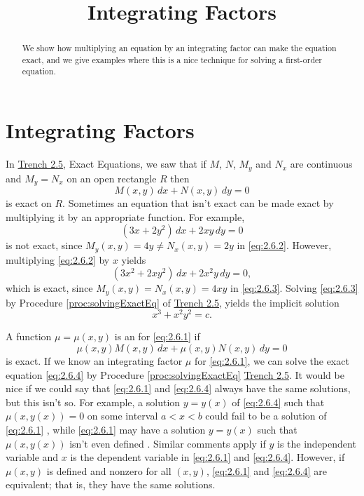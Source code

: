 \documentclass{ximera}
\title{Integrating Factors}
\begin{document}
\begin{abstract}
We show how multiplying an equation by an integrating factor can make the equation exact, and we give examples where this is a nice technique for solving a first-order equation.
\end{abstract}

\maketitle



\section*{Integrating Factors}
In \href{https://ximera.osu.edu/ode/main/exactEquations/exactEquations}{Trench 2.5}, Exact Equations, we saw that if $M$, $N$, $M_y$ and $N_x$ are
continuous and $M_y=N_x$ on an open rectangle $R$ then
\begin{equation} \label{eq:2.6.1}
M(x,y)\,dx+N(x,y)\,dy=0
\end{equation}
is exact on $R$. Sometimes an equation that isn't  exact can be made
exact by multiplying it by an appropriate function. For example,
\begin{equation}\label{eq:2.6.2}
(3x+2y^2)\,dx+2xy\,dy=0
\end{equation}
is  not exact, since
$M_y(x,y)=4y\neq  N_x(x,y)=2y$ in \eqref{eq:2.6.2}.
 However, multiplying \eqref{eq:2.6.2}  by $x$ yields
\begin{equation}\label{eq:2.6.3}
(3x^2+2xy^2)\,dx+2x^2y\,dy=0,
\end{equation}
which is exact, since
$M_y(x,y)=N_x(x,y)=4xy$ in \eqref{eq:2.6.3}.
Solving \eqref{eq:2.6.3} by Procedure \ref{proc:solvingExactEq} of \href{https://ximera.osu.edu/ode/main/exactEquations/exactEquations}{Trench 2.5},
 yields the implicit solution
$$
x^3+x^2y^2=c.
$$

A function $\mu=\mu(x,y)$ is  an  for
\eqref{eq:2.6.1}  if
\begin{equation}\label{eq:2.6.4}
 \mu(x,y)M (x,y)\,dx+\mu(x,y)N (x,y)\,dy=0
 \end{equation}
 is exact. If we know an integrating
factor $\mu$ for \eqref{eq:2.6.1}, we can solve the exact equation
\eqref{eq:2.6.4} by Procedure \ref{proc:solvingExactEq} \href{https://ximera.osu.edu/ode/main/exactEquations/exactEquations}{Trench 2.5}. It would be
nice
if we could say that \eqref{eq:2.6.1} and \eqref{eq:2.6.4} always have the
same solutions, but this isn't so. For example, a solution
$y=y(x)$ of \eqref{eq:2.6.4} such that $\mu(x,y(x))=0$ on some interval
$a<x<b$ could fail to be a solution of \eqref{eq:2.6.1}
, while
\eqref{eq:2.6.1} may have a solution $y=y(x)$ such that $\mu(x,y(x)) $
isn't even defined 
. Similar comments
apply if $y$ is the independent variable and $x$ is the dependent
variable  in \eqref{eq:2.6.1} and \eqref{eq:2.6.4}.  However, if $\mu(x,y)$
is defined and nonzero for all $(x,y)$,  \eqref{eq:2.6.1}  and
\eqref{eq:2.6.4} are equivalent; that is, they have the same solutions.
\end{document}
